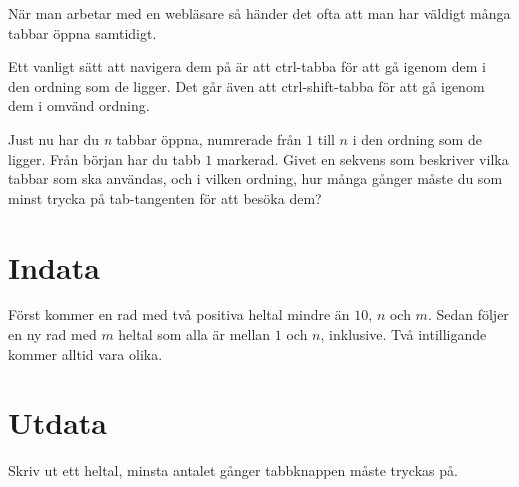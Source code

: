 
När man arbetar med en webläsare så händer det ofta att man har väldigt många
tabbar öppna samtidigt.

Ett vanligt sätt att navigera dem på är att ctrl-tabba för att gå igenom dem i
den ordning som de ligger. Det går även att ctrl-shift-tabba för att gå igenom
dem i omvänd ordning.

Just nu har du \emph{n} tabbar öppna, numrerade från $1$ till $n$ i den ordning
som de ligger. Från början har du tabb $1$ markerad. Givet en sekvens som
beskriver vilka tabbar som ska användas, och i vilken ordning, hur många gånger
måste du som minst trycka på tab-tangenten för att besöka dem?

\section*{Indata}

Först kommer en rad med två positiva heltal mindre än $10$, $n$ och $m$. Sedan
följer en ny rad med $m$ heltal som alla är mellan $1$ och $n$, inklusive. Två
intilligande kommer alltid vara olika.

\section*{Utdata}

Skriv ut ett heltal, minsta antalet gånger tabbknappen måste tryckas på.
